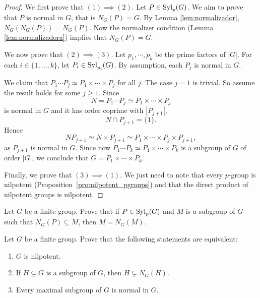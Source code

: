 \begin{proof}
We first prove that $(1)\implies(2)$. Let $P\in\mathrm{Syl}_p(G)$. We aim to prove that $P$ 
is normal in $G$, that is $N_G(P)=G$. By Lemma \ref{lem:normalizador}, 
$N_G(N_G(P))=N_G(P)$. Now the normalizer condition (Lemma \ref{lem:normalizadora}) implies that 
$N_G(P)=G$.

We now prove that $(2)\implies(3)$. Let $p_1,\cdots,p_k$ be the prime factors of 
$|G|$. For each $i\in\{1,\dots,k\}$, let  $P_i\in\mathrm{Syl}_{p_i}(G)$.
By assumption, each $P_j$ is normal in $G$.

We claim that $P_1\cdots P_j\simeq P_1\times\cdots\times P_j$ for all $j$.
The case $j=1$ is trivial. So assume the result holds for some 
$j\geq 1$. Since 
\[
N=P_1\cdots P_j\simeq P_1\times\cdots\times P_j
\]
is normal in $G$ and it has order coprime with $|P_{j+1}|$, 
\[
N\cap P_{j+1}=\{1\}.
\]
Hence 
\[
	NP_{j+1}\simeq N\times P_{j+1}\simeq P_1\times\cdots\times P_j\times P_{j+1}, 
\]
as $P_{j+1}$ is normal in $G$. 
Since now $P_1\cdots P_k\simeq P_1\times\cdots\times P_k$ is a subgroup of 
$G$ of order $|G|$, we conclude that $G=P_1\times\cdots\times P_k$.

Finally, we prove that $(3)\implies(1)$. We just need to note that 
every 
$p$-group is nilpotent (Proposition~\ref{pro:nilpotent_pgroups}) and that the direct product
of nilpotent groups is nilpotent. 
\end{proof}

\begin{exercise}
\label{xca:truco}
Let $G$ be a finite group. Prove that if $P\in\mathrm{Syl}_p(G)$ and $M$ is a subgroup of $G$ such that 
$N_G(P)\subseteq M$, then $M=N_G(M)$. 
\end{exercise}


\begin{exercise}
\label{xca:normalizadora}
Let $G$ be a finite group. Prove that the following statements are equivalent:
\begin{enumerate}
	\item $G$ is nilpotent.
	\item If $H\subsetneq G$ is a subgroup of $G$, then $H\subsetneq N_G(H)$.
	\item Every maximal subgroup of $G$ is normal in $G$.
\end{enumerate}
\end{exercise}

